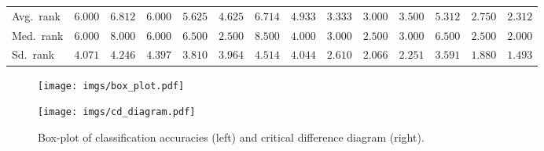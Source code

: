\documentclass{article} \usepackage{iclr2021_conference,times}
\theoremstyle{plain}
\theoremstyle{definition}
\begin{document}
\begin{table}[t]
\begin{center}
{\begin{sc}
\begin{tabular}{lccccccccccccc}
			Avg.~rank & $6.000$ & $6.812$ & $6.000$ & $5.625$ & $4.625$ & $6.714$ & $4.933$ & $3.333$ & $3.000$ & $3.500$ & $5.312$ & $\mathit{2.750}$ & $\mathbf{2.312}$ \\
			Med.~rank & $6.000$ & $8.000$ & $6.000$ & $6.500$ & $2.500$ & $8.500$ & $4.000$ & $3.000$ & $\mathit{2.500}$ & $3.000$ & $6.500$ & $\mathit{2.500}$ & $\mathbf{2.000}$ \\
			Sd.~rank & $4.071$ & $4.246$ & $4.397$ & $3.810$ & $3.964$ & $4.514$ & $4.044$ & $2.610$ & $2.066$ & $2.251$ & $3.591$ & $1.880$ & $1.493$ \\
			\bottomrule
		\end{tabular}
	\end{sc}
	}
	\end{center}
\end{table}

\begin{figure}[]
\centering
	\begin{minipage}{0.49\textwidth}
		\centering
\texttt{[image: imgs/box\_plot.pdf]}
	\end{minipage}
	\begin{minipage}{0.49\textwidth}
		\centering
		\vspace{-30pt}
\texttt{[image: imgs/cd\_diagram.pdf]}
	\end{minipage}
	\vspace{-10pt}
	\caption{Box-plot of classification accuracies (left) and critical difference diagram (right).}
	\label{fig:box_and_cd}
\end{figure}

\newpage
\end{document}
